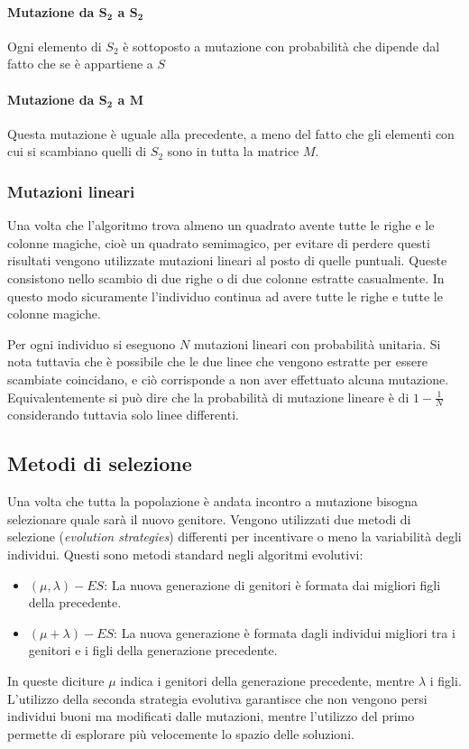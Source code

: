 \documentclass[italian,twoside,twocolumn]{article}
\begin{document}
\paragraph{Mutazione da $ \mathbf{S_2} $ a $ \mathbf{S_2} $}
Ogni elemento di $ S_2 $ è sottoposto a mutazione con probabilità che dipende dal fatto che se è appartiene a $ S_{} $

\paragraph{Mutazione da $ \mathbf{S_2} $ a $ \mathbf{M} $}
Questa mutazione è uguale alla precedente, a meno del fatto che gli elementi con cui si scambiano quelli di $ S_2 $ sono in tutta la matrice $ M $.

\subsubsection{Mutazioni lineari}
Una volta che l'algoritmo trova almeno un quadrato avente tutte le righe e le colonne magiche, cioè un quadrato semimagico, per evitare di perdere questi risultati vengono utilizzate mutazioni lineari al posto di quelle puntuali. Queste consistono nello scambio di due righe o di due colonne estratte casualmente. In questo modo sicuramente l'individuo continua ad avere tutte le righe e tutte le colonne magiche. 

Per ogni individuo si eseguono $ N $ mutazioni lineari con probabilità unitaria. Si nota tuttavia che è possibile che le due linee che vengono estratte per essere scambiate coincidano, e ciò corrisponde a non aver effettuato alcuna mutazione. Equivalentemente si può dire che la probabilità di mutazione lineare è di $ 1 - \frac{1}{N} $ considerando tuttavia solo linee differenti. 

\subsection{Metodi di selezione}
Una volta che tutta la popolazione è andata incontro a mutazione bisogna selezionare quale sarà il nuovo genitore. Vengono utilizzati due metodi di selezione (\emph{evolution strategies}) differenti per incentivare o meno la variabilità degli individui. Questi sono metodi standard negli algoritmi evolutivi:
\begin{itemize}
	\item$ (\mu, \lambda)-ES $: La nuova generazione di genitori è formata dai migliori figli della precedente.
	\item $ (\mu + \lambda)-ES $: La nuova generazione è formata dagli individui migliori tra i genitori e i figli della generazione precedente.
\end{itemize}
In queste diciture $ \mu $ indica i genitori della generazione precedente, mentre $ \lambda $ i figli. 
L'utilizzo della seconda strategia evolutiva garantisce che non vengono persi individui buoni ma modificati dalle mutazioni, mentre l'utilizzo del primo permette di esplorare più velocemente lo spazio delle soluzioni. 
\end{document}
